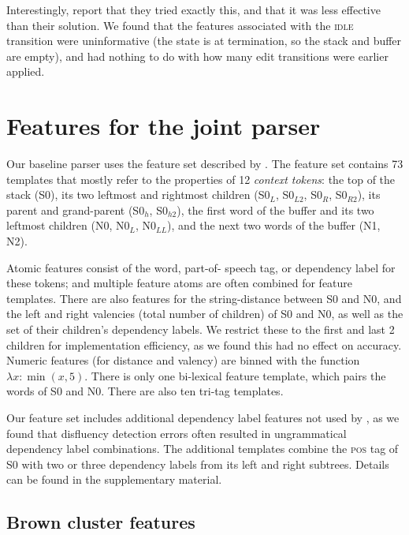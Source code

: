 \documentclass[11pt,letterpaper]{article}
\newcommand{\pos}{\textsc{pos}\xspace}
\newcommand{\szero}{S0\xspace}
\newcommand{\nzero}{N0\xspace}
\newcommand{\szeroH}{S0$_h$\xspace}
\newcommand{\szeroHH}{S0$_{h2}$\xspace}
\newcommand{\szeroL}{S0$_L$\xspace}
\newcommand{\szeroLL}{S0$_{L2}$\xspace}
\newcommand{\szeroR}{S0$_R$\xspace}
\newcommand{\szeroRR}{S0$_{R2}$\xspace}
\newcommand{\nzeroL}{N0$_L$\xspace}
\newcommand{\nzeroLL}{N0$_{LL}$\xspace}
\begin{document}
Interestingly, \citet{zhu:13} report that they tried exactly this, and that it
was less effective than their solution. We found that the features
associated with the \textsc{idle} transition were uninformative (the state is at
termination, so the stack and buffer are empty), and had nothing to do with how
many edit transitions were earlier applied.

\section{Features for the joint parser}
\label{sec:features}

Our baseline parser uses the feature set described by \citet{zhang:11}.
The feature set contains 73 templates that mostly refer to the properties of
12 \emph{context tokens}: the top of the stack (\szero), its two leftmost and
rightmost children (\szeroL, \szeroLL, \szeroR, \szeroRR), its parent and
grand-parent (\szeroH, \szeroHH), the first word of the buffer and its two leftmost
children (\nzero, \nzeroL, \nzeroLL), and the next two words of the buffer (N1, N2).

Atomic features consist of the word, part-of- speech tag, or dependency label
for these tokens; and multiple feature atoms are often combined for feature
templates. There are also features for the string-distance between \szero
and \nzero, and the left and right valencies
(total number of children) of \szero and \nzero, as well as the set of their children's
dependency labels. We restrict these
to the first and last 2 children for implementation efficiency, as we found this
had no effect on accuracy. Numeric features (for distance and valency) are binned
with the function $\lambda x: \min(x, 5)$.
There is only one bi-lexical feature template, which pairs
the words of \szero and \nzero.
There are also ten tri-tag templates.

Our feature set includes additional dependency label features not used by \citet{zhang:11},
as we found that disfluency detection errors often resulted in ungrammatical
dependency label combinations.  The additional templates combine the \pos tag of \szero with
two or three dependency labels from its left and right subtrees.  Details can be found in
the supplementary material.

\subsection{Brown cluster features}
\label{sec:browns}
\end{document}

